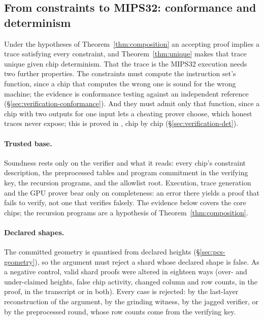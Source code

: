 \subsection{From constraints to MIPS32: conformance and determinism}
\label{sec:verification}

Under the hypotheses of Theorem~\ref{thm:composition} an accepting proof implies a trace satisfying every constraint, and Theorem~\ref{thm:unique} makes that trace unique given chip determinism. That the trace is the MIPS32 execution needs two further properties. The constraints must compute the instruction set's function, since a chip that computes the wrong one is sound for the wrong machine; the evidence is conformance testing against an independent reference (\S\ref{sec:verification-conformance}). And they must admit only that function, since a chip with two outputs for one input lets a cheating prover choose, which honest traces never expose; this is proved in \Lean{}, chip by chip (\S\ref{sec:verification-det}).

\paragraph{Trusted base.} Soundness rests only on the verifier and what it reads: every chip's constraint description, the preprocessed tables and program commitment in the verifying key, the recursion programs, and the allowlist root. Execution, trace generation and the GPU prover bear only on completeness: an error there yields a proof that fails to verify, not one that verifies falsely. The evidence below covers the core chips; the recursion programs are a hypothesis of Theorem~\ref{thm:composition}.

\paragraph{Declared shapes.}\label{sec:verification-forgery} The committed geometry is quantised from declared heights (\S\ref{sec:pcs-geometry}), so the argument must reject a shard whose declared shape is false. As a negative control, valid shard proofs were altered in eighteen ways (over- and under-claimed heights, false chip activity, changed column and row counts, in the proof, in the transcript or in both). Every case is rejected: by the last-layer reconstruction of the \LogUp{} argument, by the grinding witness, by the jagged verifier, or by the preprocessed round, whose row counts come from the verifying key.

